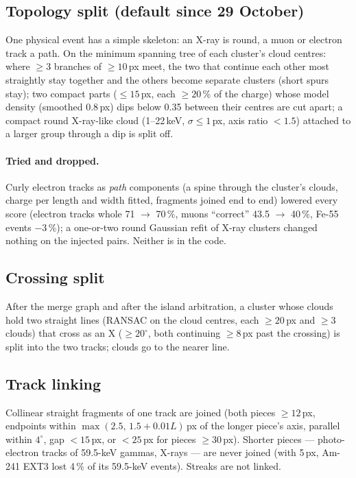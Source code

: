 \documentclass[11pt,a4paper]{article}
\begin{document}
\subsection{Topology split (default since 29 October)}\label{sec:topo}
One physical event has a simple skeleton: an X-ray is round, a muon or electron track a path. On the minimum spanning tree of
each cluster's cloud centres: where $\ge3$ branches of $\ge10$\,px meet, the two that continue each other most straightly stay
together and the others become separate clusters (short spurs stay); two compact parts ($\le15$\,px, each $\ge20$\,\% of the
charge) whose model density (smoothed 0.8\,px) dips below 0.35 between their centres are cut apart; a compact round X-ray-like
cloud (1--22\,keV, $\sigma\le1$\,px, axis ratio $<1.5$) attached to a larger group through a dip is split off.

\paragraph{Tried and dropped.} Curly electron tracks as \emph{path} components (a spine through the cluster's clouds, charge per
length and width fitted, fragments joined end to end) lowered every score (electron tracks whole 71 $\to$ 70\,\%, muons
``correct'' 43.5 $\to$ 40\,\%, Fe-55 events $-3$\,\%); a one-or-two round Gaussian refit of X-ray clusters changed nothing on the
injected pairs. Neither is in the code.

\subsection{Crossing split}
After the merge graph and after the island arbitration, a cluster whose clouds hold two straight lines (RANSAC on the cloud
centres, each $\ge20$\,px and $\ge3$ clouds) that cross as an X ($\ge20^\circ$, both continuing $\ge8$\,px past the crossing) is
split into the two tracks; clouds go to the nearer line.

\subsection{Track linking}
Collinear straight fragments of one track are joined (both pieces $\ge12$\,px, endpoints within $\max(2.5,\,1.5+0.01L)$\,px of
the longer piece's axis, parallel within $4^\circ$, gap $<15$\,px, or $<25$\,px for pieces $\ge30$\,px). Shorter pieces ---
photo-electron tracks of 59.5-keV gammas, X-rays --- are never joined (with 5\,px, Am-241 EXT3 lost 4\,\% of its 59.5-keV
events). Streaks are not linked.
\end{document}
